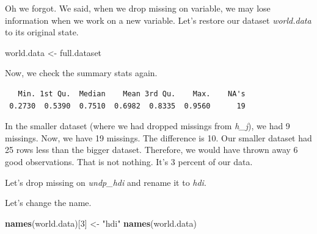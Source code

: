 \documentclass[]{book}
\newenvironment{Shaded}{\begin{snugshade}}{\end{snugshade}}
\newcommand{\KeywordTok}[1]{\textcolor[rgb]{0.13,0.29,0.53}{\textbf{#1}}}
\newcommand{\DecValTok}[1]{\textcolor[rgb]{0.00,0.00,0.81}{#1}}
\newcommand{\StringTok}[1]{\textcolor[rgb]{0.31,0.60,0.02}{#1}}
\newcommand{\OperatorTok}[1]{\textcolor[rgb]{0.81,0.36,0.00}{\textbf{#1}}}
\newcommand{\NormalTok}[1]{#1}
\theoremstyle{definition}
\theoremstyle{definition}
\theoremstyle{definition}
\theoremstyle{remark}
\begin{document}
Oh we forgot. We said, when we drop missing on variable, we may lose
information when we work on a new variable. Let's restore our dataset
\emph{world.data} to its original state.

\begin{Shaded}
\begin{Highlighting}[]
\NormalTok{world.data <-}\StringTok{ }\NormalTok{full.dataset}
\end{Highlighting}
\end{Shaded}

Now, we check the summary stats again.

\begin{Shaded}
\end{Shaded}

\begin{verbatim}
   Min. 1st Qu.  Median    Mean 3rd Qu.    Max.    NA's 
 0.2730  0.5390  0.7510  0.6982  0.8335  0.9560      19 
\end{verbatim}

In the smaller dataset (where we had dropped missings from \emph{h\_j}),
we had 9 missings. Now, we have 19 missings. The difference is 10. Our
smaller dataset had 25 rows less than the bigger dataset. Therefore, we
would have thrown away 6 good observations. That is not nothing. It's 3
percent of our data.

Let's drop missing on \emph{undp\_hdi} and rename it to \emph{hdi}.

\begin{Shaded}
\end{Shaded}

Let's change the name.

\begin{Shaded}
\begin{Highlighting}[]
\KeywordTok{names}\NormalTok{(world.data)[}\DecValTok{3}\NormalTok{] <-}\StringTok{ "hdi"}
\KeywordTok{names}\NormalTok{(world.data)}
\end{Highlighting}
\end{Shaded}
\end{document}
